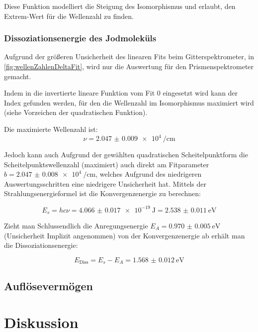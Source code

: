 \documentclass[12pt,english,ngerman]{scrartcl}
\begin{document}
Diese Funktion modelliert die Steigung des Isomorphismus und erlaubt, den
Extrem-Wert für die Wellenzahl zu finden.

\subsubsection{Dissoziationsenergie des Jodmoleküls}
Aufgrund der größeren Unsicherheit des linearen Fits beim Gitterspektrometer,
in \autoref{fig:wellenZahlenDeltaFit}, wird nur die Auswertung für den
Prismenspektrometer gemacht.

Indem in die invertierte lineare Funktion vom Fit 0 eingesetzt wird kann der
Index gefunden werden, für den die Wellenzahl im Isomorphismus maximiert wird
(siehe Vorzeichen der quadratischen Funktion). 

Die maximierte Wellenzahl ist:
\begin{equation}
	\nu = \SI{2.047(9)e4}{\per\cm}
\end{equation}


Jedoch kann auch Aufgrund der gewählten quadratischen Scheitelpunktform die
Scheitelpunktswellenzahl (maximiert) auch direkt am Fitparameter $b =
	\SI{2.047(8)e4}{\per\cm}$, welches Aufgrund des niedrigeren
Auswertungsschritten eine niedrigere Unsicherheit hat. Mittels der
Strahlungsenergieformel ist die Konvergenzenergie zu berechnen:

\begin{equation}
	E_s = h c \nu = \SI{4.066(17)e-19}{\joule} = \SI{2.538(11)}{\electronvolt}
\end{equation}

Zieht man Schlussendlich die Anregungsenergie
$E_A=\SI{0.970(5)}{\electronvolt}$ (Unsicherheit Implizit angenommen) von der
Konvergenzenergie ab erhält man die Dissoziationsenergie:

\begin{equation}
	E_\text{Diss} = E_s - E_A = \SI{1.568(12)}{\electronvolt}
\end{equation}

\subsection{Auflösevermögen}


\section{Diskussion}\label{sec:disk}
\end{document}
